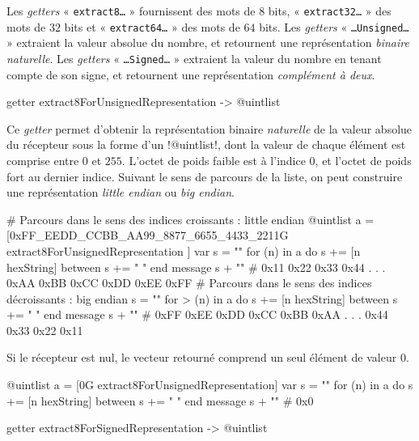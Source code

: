 Les \emph{getters} « \texttt{extract8…} » fournissent des mots de $8$ bits, « \texttt{extract32…} »  des mots de $32$ bits et « \texttt{extract64…} »  des mots de $64$ bits. Les \emph{getters} « \texttt{…Unsigned…} » extraient la valeur absolue du nombre, et retournent une représentation \emph{binaire naturelle}. Les \emph{getters} « \texttt{…Signed…} » extraient la valeur du nombre en tenant compte de son signe, et retournent une représentation \emph{complément à deux}.


\begin{galgasbox}
getter extract8ForUnsignedRepresentation -> @uintlist
\end{galgasbox}

Ce \emph{getter} permet d'obtenir la représentation binaire \emph{naturelle} de la valeur absolue du récepteur sous la forme d'un \ggs!@uintlist!, dont la valeur de chaque élément est comprise entre $0$ et $255$. L'octet de poids faible est à l'indice $0$, et l'octet de poids fort au dernier indice. Suivant le sens de parcours de la liste, on peut construire une représentation \emph{little endian} ou \emph{big endian}.

\begin{galgas}
# Parcours dans le sens des indices croissants : little endian
@uintlist a = [0xFF_EEDD_CCBB_AA99_8877_6655_4433_2211G
  extract8ForUnsignedRepresentation
]
var s = ""
for (n) in a
  do s += [n hexString]
  between s += " "
end
message s + "\n" # 0x11 0x22 0x33 0x44 . . . 0xAA 0xBB 0xCC 0xDD 0xEE 0xFF 
# Parcours dans le sens des indices décroissants : big endian
s = ""
for > (n) in a
  do s += [n hexString]
  between s += " "
end
message s + "\n" # 0xFF 0xEE 0xDD 0xCC 0xBB 0xAA . . . 0x44 0x33 0x22 0x11
\end{galgas}

Si le récepteur est nul, le vecteur retourné comprend un seul élément de valeur $0$.

\begin{galgas}
@uintlist a = [0G extract8ForUnsignedRepresentation]
var s = ""
for (n) in a
  do s += [n hexString]
  between s += " "
end
message s + "\n" # 0x0
\end{galgas}


\begin{galgasbox}
getter extract8ForSignedRepresentation -> @uintlist
\end{galgasbox}


